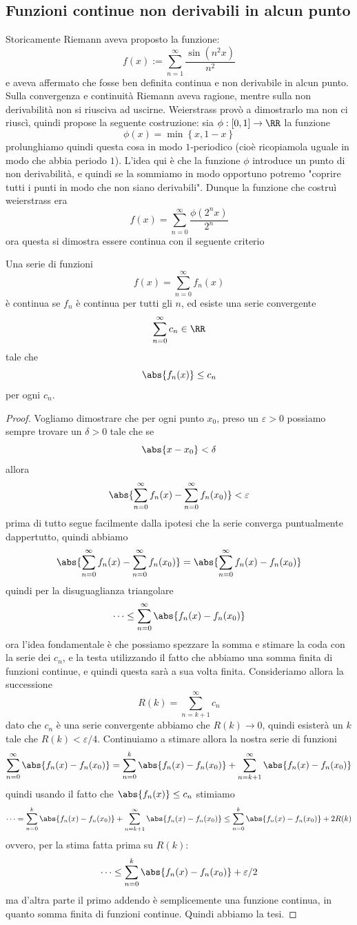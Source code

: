 \documentclass[11pt]{scrartcl}
\begin{document}
	 \subsection{Funzioni continue non derivabili in alcun punto}
	 Storicamente Riemann aveva proposto la funzione:
	 $$f(x):=\sum_{n=1}^{\infty}\frac{\sin(n^2 x)}{n^2}$$
	 e aveva affermato che fosse ben definita continua e non derivabile in alcun punto. Sulla convergenza e continuità Riemann aveva ragione, mentre sulla non derivabilità non si riusciva ad uscirne. Weierstrass provò a dimostrarlo ma non ci riuscì, quindi propose la seguente costruzione: sia $\phi:[0,1]\to \RR$ la funzione
	 $$\phi(x)=\min\left\{x,1-x\right\}$$
	 prolunghiamo quindi questa cosa in modo $1$-periodico (cioè ricopiamola uguale in modo che abbia periodo $1$). L'idea qui è che la funzione $\phi$ introduce un punto di non derivabilità, e quindi se la sommiamo in modo opportuno potremo "coprire tutti i punti in modo che non siano derivabili". Dunque la funzione che costruì weierstrass era
	 $$f(x)=\sum_{n=0}^{\infty}\frac{\phi(2^n x)}{2^n}$$
	 ora questa si dimostra essere continua con il seguente criterio
	 \begin{lemma}
	 	Una serie di funzioni
	 	$$f(x)=\sum_{n=0}^\infty f_n(x)$$
	 	è continua se $f_n$ è continua per tutti gli $n$, ed esiste una serie convergente 
	 	$$\sum_{n=0}^\infty c_n \in \RR$$
	 	tale che
	 	$$\abs{f_n(x)}\le c_n$$
	 	per ogni $c_n$. 
	 \end{lemma}
	 \begin{proof}
	 	Vogliamo dimostrare che per ogni punto $x_0$, preso un $\varepsilon>0$ possiamo sempre trovare un $\delta>0$ tale che se 
	 	$$\abs{x-x_0}<\delta$$
	 	allora 
	 	$$\abs{\sum_{n=0}^{\infty}f_n(x)-\sum_{n=0}^\infty f_n(x_0)}<\varepsilon$$
	 	prima di tutto segue facilmente dalla ipotesi che la serie converga puntualmente dappertutto, quindi abbiamo
	 	$$\abs{\sum_{n=0}^{\infty}f_n(x)-\sum_{n=0}^\infty f_n(x_0)}=\abs{\sum_{n=0}^{\infty}f_n(x)-f_n(x_0)}$$
	 	quindi per la disuguaglianza triangolare
	 	$$\dots\le \sum_{n=0}^{\infty}\abs{f_n(x)-f_n(x_0)}$$
	 	ora l'idea fondamentale è che possiamo spezzare la somma e stimare la coda con la serie dei $c_n$, e la testa utilizzando il fatto che abbiamo una somma finita di funzioni continue, e quindi questa sarà a sua volta finita. Consideriamo allora la successione 
	 	$$R(k)=\sum_{n=k+1}^\infty c_n$$
	 	dato che $c_n$ è una serie convergente abbiamo che $R(k)\to 0$, quindi esisterà un $k$ tale che $R(k)<\varepsilon/4$. Continuiamo a stimare allora la nostra serie di funzioni
	 	$$\sum_{n=0}^{\infty}\abs{f_n(x)-f_n(x_0)}=\sum_{n=0}^{k}\abs{f_n(x)-f_n(x_0)}+\sum_{n=k+1}^{\infty}\abs{f_n(x)-f_n(x_0)}$$ 
	 	quindi usando il fatto che $\abs{f_n(x)}\le c_n$ stimiamo
	 	$$\dots = \sum_{n=0}^{k}\abs{f_n(x)-f_n(x_0)}+\sum_{n=k+1}^{\infty}\abs{f_n(x)-f_n(x_0)}\le \sum_{n=0}^{k}\abs{f_n(x)-f_n(x_0)}+2R(k)$$ 
	 	ovvero, per la stima fatta prima su $R(k)$:
	 	$$\dots \le \sum_{n=0}^{k}\abs{f_n(x)-f_n(x_0)} +\varepsilon/2$$
	 	ma d'altra parte il primo addendo è semplicemente una funzione continua, in quanto somma finita di funzioni continue. Quindi abbiamo la tesi.
	 \end{proof}
\end{document}
